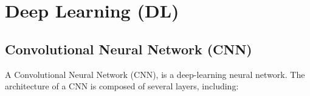 



\section{Deep Learning (DL)}



\subsection{Convolutional Neural Network (CNN)}

A Convolutional Neural Network (CNN), is a deep-learning neural network. The architecture of a CNN is composed of several layers, including:

